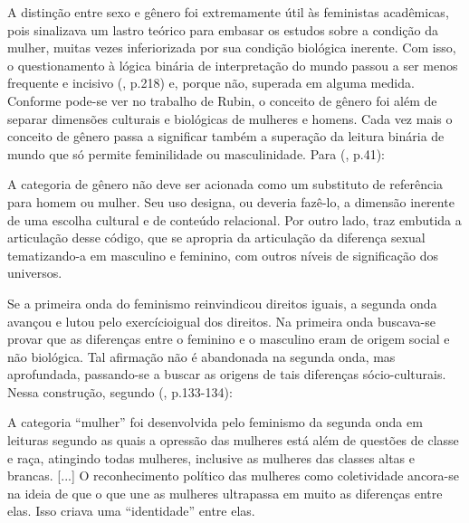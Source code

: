 A distinção entre sexo e gênero foi extremamente útil às feministas acadêmicas, pois sinalizava um lastro teórico para embasar os estudos sobre a condição da mulher, muitas vezes inferiorizada por sua condição biológica inerente. Com isso, o questionamento à lógica binária de interpretação do mundo passou a ser menos frequente e incisivo (\citeyear{HARAWAY2004}, p.218) e, porque não, superada em alguma medida. Conforme pode-se ver no trabalho de Rubin, o conceito de gênero foi além de separar dimensões culturais e biológicas de mulheres e homens. Cada vez mais o conceito de gênero passa a significar também a superação da leitura binária de mundo que só permite feminilidade ou masculinidade. Para (\citeyear{HEILBORN1992}, p.41):

\begin{citacao}
A categoria de gênero não deve ser acionada como um substituto de referência para homem ou mulher. Seu uso designa, ou deveria fazê-lo, a dimensão inerente de uma escolha cultural e de conteúdo relacional. Por outro lado, traz embutida a articulação desse código, que se apropria da articulação da diferença sexual tematizando-a em masculino e feminino, com outros níveis de significação dos universos.
\end{citacao}

Se a primeira onda do feminismo reinvindicou direitos iguais, a segunda onda avançou e lutou pelo exercícioigual dos direitos. Na primeira onda buscava-se provar que as diferenças entre o feminino e o masculino eram de origem social e não biológica. Tal afirmação não é abandonada na segunda onda, mas aprofundada, passando-se a buscar as origens de tais diferenças sócio-culturais. Nessa construção, segundo (\citeyear{PISCITELLI2009}, p.133-134):

\begin{citacao}
A categoria ``mulher'' foi desenvolvida pelo feminismo da segunda onda em leituras segundo as quais a opressão das mulheres está além de questões de classe e raça, atingindo todas mulheres, inclusive as mulheres das classes altas e brancas. [...] O reconhecimento político das mulheres como coletividade ancora-se na ideia de que o que une as mulheres ultrapassa em muito as diferenças entre elas. Isso criava uma ``identidade'' entre elas.
\end{citacao}


